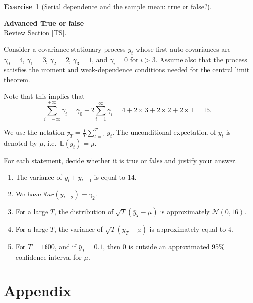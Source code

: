 \documentclass[
  11pt,
]{book}
\theoremstyle{definition}
\theoremstyle{definition}
\theoremstyle{definition}
\newtheorem{exercise}{Exercise}[chapter]
\theoremstyle{definition}
\theoremstyle{remark}
\begin{document}
\begin{exercisebox}

\begin{exercise}[Serial dependence and the sample mean: true or false?]
\protect\hypertarget{exr:time-series-sample-mean-true-false}{}\label{exr:time-series-sample-mean-true-false}

\textbf{Advanced \textbar{} True or false}\\
Review Section \ref{TS}.

Consider a covariance-stationary process \(y_t\) whose first auto-covariances are \(\gamma_0=4\), \(\gamma_1=3\), \(\gamma_2=2\), \(\gamma_3=1\), and \(\gamma_i=0\) for \(i>3\). Assume also that the process satisfies the moment and weak-dependence conditions needed for the central limit theorem.

Note that this implies that \[\sum_{i=-\infty}^{+\infty}\gamma_i
=
\gamma_0 + 2\sum_{i=1}^{\infty}\gamma_i
=
4 + 2\times 3 + 2\times 2 + 2\times 1
=
16.\]

We use the notation \(\bar{y}_T=\displaystyle \frac{1}{T}\sum_{t=1}^T y_t\). The unconditional expectation of \(y_t\) is denoted by \(\mu\), i.e.~\(\mathbb{E}(y_t)=\mu\).

For each statement, decide whether it is true or false and justify your answer.

\begin{enumerate}
\def\labelenumi{\arabic{enumi}.}
\item
  The variance of \(y_t+y_{t-1}\) is equal to 14.
\item
  We have \(\mathbb{V}ar(y_{t-2})=\gamma_2\).
\item
  For a large \(T\), the distribution of \(\sqrt{T}(\bar{y}_T-\mu)\) is approximately \(\mathcal{N}(0,16)\).
\item
  For a large \(T\), the variance of \(\sqrt{T}(\bar{y}_T-\mu)\) is approximately equal to \(4\).
\item
  For \(T=1600\), and if \(\bar{y}_T=0.1\), then \(0\) is outside an approximated 95\% confidence interval for \(\mu\).
\end{enumerate}

\end{exercise}

\end{exercisebox}

\chapter{Appendix}\label{append}
\end{document}
